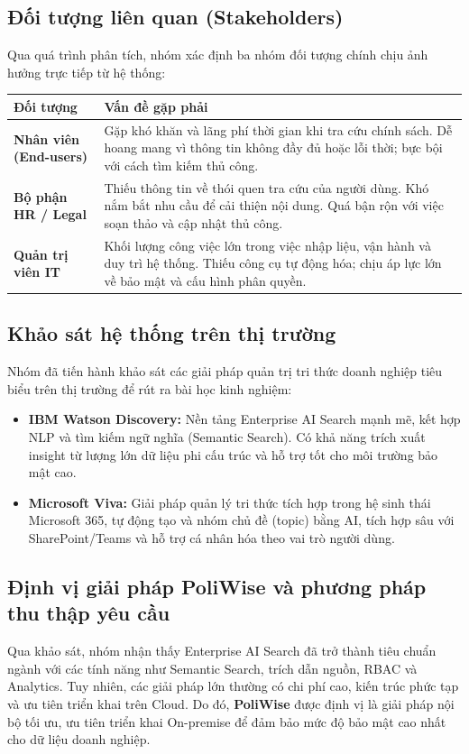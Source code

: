 \documentclass[12pt,a4paper]{report}
\begin{document}
\subsection{Đối tượng liên quan (Stakeholders)}
Qua quá trình phân tích, nhóm xác định ba nhóm đối tượng chính chịu ảnh hưởng trực tiếp từ hệ thống:

\begin{table}[H]
\centering
\begin{tabularx}{\textwidth}{|l|X|}
\hline
\rowcolor{gray!10}
Đối tượng & Vấn đề gặp phải \\ \hline
\textbf{Nhân viên (End-users)} & Gặp khó khăn và lãng phí thời gian khi tra cứu chính sách. Dễ hoang mang vì thông tin không đầy đủ hoặc lỗi thời; bực bội với cách tìm kiếm thủ công. \\ \hline
\textbf{Bộ phận HR / Legal} & Thiếu thông tin về thói quen tra cứu của người dùng. Khó nắm bắt nhu cầu để cải thiện nội dung. Quá bận rộn với việc soạn thảo và cập nhật thủ công. \\ \hline
\textbf{Quản trị viên IT} & Khối lượng công việc lớn trong việc nhập liệu, vận hành và duy trì hệ thống. Thiếu công cụ tự động hóa; chịu áp lực lớn về bảo mật và cấu hình phân quyền. \\ \hline
\end{tabularx}
\end{table}

\subsection{Khảo sát hệ thống trên thị trường}
Nhóm đã tiến hành khảo sát các giải pháp quản trị tri thức doanh nghiệp tiêu biểu trên thị trường để rút ra bài học kinh nghiệm:
\begin{itemize}
    \item \textbf{IBM Watson Discovery:} Nền tảng Enterprise AI Search mạnh mẽ, kết hợp NLP và tìm kiếm ngữ nghĩa (Semantic Search). Có khả năng trích xuất insight từ lượng lớn dữ liệu phi cấu trúc và hỗ trợ tốt cho môi trường bảo mật cao.
    \item \textbf{Microsoft Viva:} Giải pháp quản lý tri thức tích hợp trong hệ sinh thái Microsoft 365, tự động tạo và nhóm chủ đề (topic) bằng AI, tích hợp sâu với SharePoint/Teams và hỗ trợ cá nhân hóa theo vai trò người dùng.
\end{itemize}

\subsection{Định vị giải pháp PoliWise và phương pháp thu thập yêu cầu}
Qua khảo sát, nhóm nhận thấy Enterprise AI Search đã trở thành tiêu chuẩn ngành với các tính năng như Semantic Search, trích dẫn nguồn, RBAC và Analytics. Tuy nhiên, các giải pháp lớn thường có chi phí cao, kiến trúc phức tạp và ưu tiên triển khai trên Cloud. Do đó, \textbf{PoliWise} được định vị là giải pháp nội bộ tối ưu, ưu tiên triển khai On-premise để đảm bảo mức độ bảo mật cao nhất cho dữ liệu doanh nghiệp.
\end{document}
